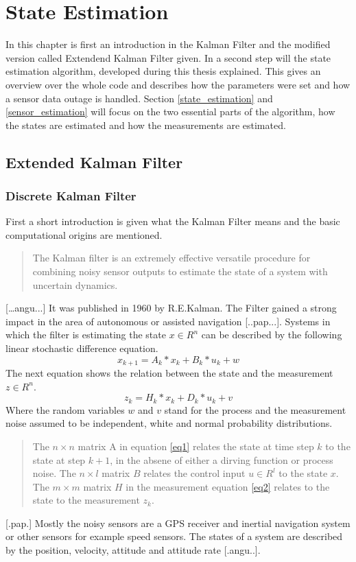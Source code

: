 \chapter{State Estimation}\label{cha3}
In this chapter is first an introduction in the Kalman Filter and the modified version called Extendend Kalman Filter given. In a second step will the state estimation algorithm, developed during this thesis explained. This gives an overview over the whole code and describes how the parameters were set and how a sensor data outage is handled. Section \ref{state_estimation} and \ref{sensor_estimation} will focus on the two essential parts of the algorithm, how the states are estimated and how the measurements are estimated.
\section{Extended Kalman Filter}

\subsection*{Discrete Kalman Filter}
First a short introduction is given what the Kalman Filter means and the basic computational origins are mentioned.
\begin{quote}The Kalman filter is an extremely effective versatile procedure for combining noisy sensor outputs to estimate the state of a system with uncertain dynamics.\end{quote} […angu...] It was published in 1960 by R.E.Kalman. The Filter gained a strong impact in the area of autonomous or assisted navigation [..pap...]. 
Systems in which the filter is estimating the state $x \in R^{n}$ can be described by the following linear stochastic difference equation.
\begin{equation}
x_{k+1}=A_k*x_k+B_k*u_k+w
\label{eq1}
\end{equation} The next equation shows the relation between the state and the measurement $z \in R^{n}$.
\begin{equation} 
z_k=H_k*x_k+D_k*u_k+v
\label{eq2}
\end{equation}
Where the random variables $w$ and $v$ stand for the process and the measurement noise assumed to be independent, white and normal probability distributions.
\begin{quote}The $n\times n$ matrix A in equation \ref{eq1} relates the state at time step $k$ to the state at step $k+1$, in the absene of either a dirving function or process noise. The $n\times l$ matrix $B$ relates the control input $u \in R^{l}$ to the state $x$. The $m \times m$ matrix $H$ in the measurement equation \ref{eq2} relates to the state to the measurement $z_k$.\end{quote}[.pap.]
Mostly the noisy sensors are a GPS receiver and inertial navigation system or other sensors for example speed sensors. The states of a system are described by the position, velocity, attitude and attitude rate [.angu..].

